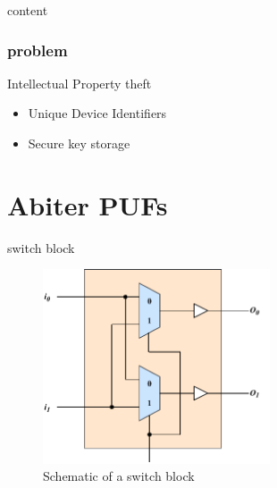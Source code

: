 \documentclass[10pt, compress]{beamer}
\title{}
\subtitle{On Statistical Properties of\\Arbiter Physical Unclonable Function}
\date{\today}
\author{Phillip Gajland}
\institute{KTH Royal Institute of Technology}
\begin{document}
\maketitle

\begin{frame}{content}
    \tableofcontents
\end{frame}


\begin{frame}[fragile]
  \frametitle{problem}

  Intellectual Property theft 
  
  \begin{itemize}
      \item Unique Device Identifiers
      \item Secure key storage
  \end{itemize}
\end{frame}

\section{Abiter PUFs}

\begin{frame}{switch block}
    \begin{figure}
        \centering
        \includegraphics[width=0.6\textwidth]{figures/switch_block_detailed.pdf}
        \caption{Schematic of a switch block}
    \end{figure}
\end{frame}
\end{document}
